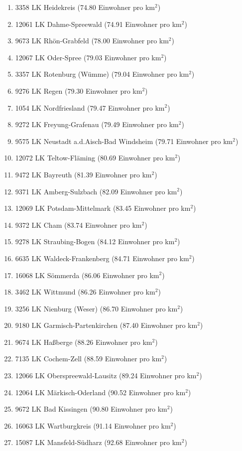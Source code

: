 \begin{enumerate}[itemsep=-6mm]
\item 3358 LK Heidekreis (74.80 Einwohner pro km$^2$)
\item 12061 LK Dahme-Spreewald (74.91 Einwohner pro km$^2$)
\item 9673 LK Rhön-Grabfeld (78.00 Einwohner pro km$^2$)
\item 12067 LK Oder-Spree (79.03 Einwohner pro km$^2$)
\item 3357 LK Rotenburg (Wümme) (79.04 Einwohner pro km$^2$)
\item 9276 LK Regen (79.30 Einwohner pro km$^2$)
\item 1054 LK Nordfriesland (79.47 Einwohner pro km$^2$)
\item 9272 LK Freyung-Grafenau (79.49 Einwohner pro km$^2$)
\item 9575 LK Neustadt a.d.Aisch-Bad Windsheim (79.71 Einwohner pro km$^2$)
\item 12072 LK Teltow-Fläming (80.69 Einwohner pro km$^2$)
\item 9472 LK Bayreuth (81.39 Einwohner pro km$^2$)
\item 9371 LK Amberg-Sulzbach (82.09 Einwohner pro km$^2$)
\item 12069 LK Potsdam-Mittelmark (83.45 Einwohner pro km$^2$)
\item 9372 LK Cham (83.74 Einwohner pro km$^2$)
\item 9278 LK Straubing-Bogen (84.12 Einwohner pro km$^2$)
\item 6635 LK Waldeck-Frankenberg (84.71 Einwohner pro km$^2$)
\item 16068 LK Sömmerda (86.06 Einwohner pro km$^2$)
\item 3462 LK Wittmund (86.26 Einwohner pro km$^2$)
\item 3256 LK Nienburg (Weser) (86.70 Einwohner pro km$^2$)
\item 9180 LK Garmisch-Partenkirchen (87.40 Einwohner pro km$^2$)
\item 9674 LK Haßberge (88.26 Einwohner pro km$^2$)
\item 7135 LK Cochem-Zell (88.59 Einwohner pro km$^2$)
\item 12066 LK Oberspreewald-Lausitz (89.24 Einwohner pro km$^2$)
\item 12064 LK Märkisch-Oderland (90.52 Einwohner pro km$^2$)
\item 9672 LK Bad Kissingen (90.80 Einwohner pro km$^2$)
\item 16063 LK Wartburgkreis (91.14 Einwohner pro km$^2$)
\item 15087 LK Mansfeld-Südharz (92.68 Einwohner pro km$^2$)

\end{enumerate}
